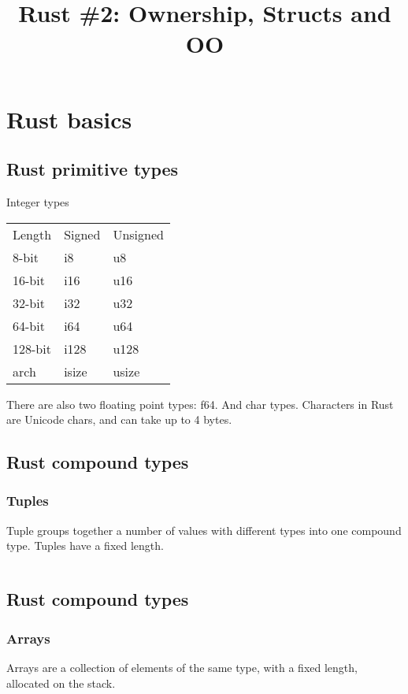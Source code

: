 \documentclass[usenames,twocolumn,dvipsnames,10pt,a4wide]{article}
\title{Rust \#2: Ownership, Structs and OO}
\begin{document}
\maketitle

\section{Rust basics}
\subsection{Rust primitive types} 
Integer types
\begin{table}[]
\begin{tabular}{lll}
Length  & Signed & Unsigned \\
8-bit   & i8     & u8       \\
16-bit  & i16    & u16      \\
32-bit  & i32    & u32      \\
64-bit  & i64    & u64      \\
128-bit & i128   & u128     \\
arch    & isize  & usize    \\
\end{tabular}
\end{table}

There are also two floating point types:
f64.
And char types.
Characters in Rust are Unicode chars, and can take up to 4 bytes.


\subsection{Rust compound types}
\subsubsection{Tuples}
Tuple groups together a number of values with different
types into one compound type. Tuples have a fixed length.

\inputminted[fontsize=\normalsize]{rust}{code/tuple.rs}



\subsection{Rust compound types}
\subsubsection{Arrays}
Arrays are a collection of elements of the same type,
with a fixed length, allocated on the stack.
\end{document}
